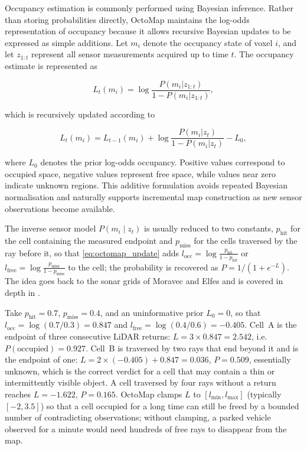 \documentclass[graybox,envcountchap]{style/SNmono}
\begin{document}
Occupancy estimation is commonly performed using Bayesian inference. Rather than storing probabilities directly, OctoMap maintains the log-odds representation of occupancy because it allows recursive Bayesian updates to be expressed as simple additions. Let $m_i$ denote the occupancy state of voxel $i$, and let $z_{1:t}$ represent all sensor measurements acquired up to time $t$. The occupancy estimate is represented as

\begin{equation}
L_t(m_i)
=
\log
\frac{P(m_i|z_{1:t})}{1-P(m_i|z_{1:t})},
\label{eq:octomap_logodds}
\end{equation}

which is recursively updated according to

\begin{equation}
L_t(m_i)
=
L_{t-1}(m_i)
+
\log
\frac{P(m_i|z_t)}{1-P(m_i|z_t)}
-
L_0,
\label{eq:octomap_update}
\end{equation}

where $L_0$ denotes the prior log-odds occupancy. Positive values correspond to occupied space, negative values represent free space, while values near zero indicate unknown regions. This additive formulation avoids repeated Bayesian normalisation and naturally supports incremental map construction as new sensor observations become available.

The inverse sensor model $P(m_i\mid z_t)$ is usually reduced to two constants, $p_{\mathrm{hit}}$ for the cell containing the measured endpoint and $p_{\mathrm{miss}}$ for the cells traversed by the ray before it, so that \eqref{eq:octomap_update} adds $l_{\mathrm{occ}}=\log\frac{p_{\mathrm{hit}}}{1-p_{\mathrm{hit}}}$ or $l_{\mathrm{free}}=\log\frac{p_{\mathrm{miss}}}{1-p_{\mathrm{miss}}}$ to the cell; the probability is recovered as $P=1/(1+e^{-L})$. The idea goes back to the sonar grids of Moravec and Elfes \cite{moravec1985_grid} and is covered in depth in \cite{thrun_probabilistic_2005}.
\begin{example}
\label{ex:logodds}
Take $p_{\mathrm{hit}}=0.7$, $p_{\mathrm{miss}}=0.4$, and an uninformative prior $L_0=0$, so that $l_{\mathrm{occ}}=\log(0.7/0.3)=0.847$ and $l_{\mathrm{free}}=\log(0.4/0.6)=-0.405$. Cell~A is the endpoint of three consecutive LiDAR returns: $L=3\times0.847=2.542$, i.e.\ $P(\text{occupied})=0.927$. Cell~B is traversed by two rays that end beyond it and is the endpoint of one: $L=2\times(-0.405)+0.847=0.036$, $P=0.509$, essentially unknown, which is the correct verdict for a cell that may contain a thin or intermittently visible object. A cell traversed by four rays without a return reaches $L=-1.622$, $P=0.165$. OctoMap clamps $L$ to $[l_{\min},l_{\max}]$ (typically $[-2,3.5]$) so that a cell occupied for a long time can still be freed by a bounded number of contradicting observations; without clamping, a parked vehicle observed for a minute would need hundreds of free rays to disappear from the map.
\end{example}
\end{document}
